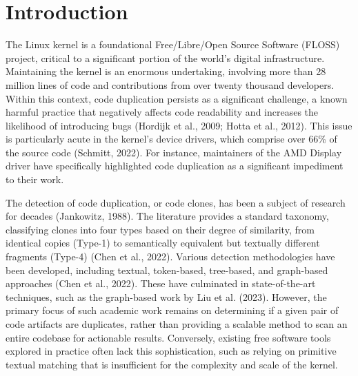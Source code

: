 \documentclass[conference]{IEEEtran}
\begin{document}




%
\IEEEpeerreviewmaketitle



\section{Introduction}

The Linux kernel is a foundational Free/Libre/Open Source Software (FLOSS) project, 
critical to a significant portion of the world's digital infrastructure. Maintaining 
the kernel is an enormous undertaking, involving more than 28 million lines of code 
and contributions from over twenty thousand developers. Within this context, code 
duplication persists as a significant challenge, a known harmful practice that 
negatively affects code readability and increases the likelihood of introducing bugs 
(Hordijk et al., 2009; Hotta et al., 2012). This issue is particularly acute in the 
kernel's device drivers, which comprise over 66\% of the source code (Schmitt, 2022). 
For instance, maintainers of the AMD Display driver have specifically highlighted code 
duplication as a significant impediment to their work.

The detection of code duplication, or code clones, has been a subject of research for 
decades (Jankowitz, 1988). The literature provides a standard taxonomy, classifying 
clones into four types based on their degree of similarity, from identical copies 
(Type-1) to semantically equivalent but textually different fragments (Type-4) (Chen et al., 2022). 
Various detection methodologies have been developed, including textual, token-based, 
tree-based, and graph-based approaches (Chen et al., 2022). These have culminated in 
state-of-the-art techniques, such as the graph-based work by Liu et al. (2023). 
However, the primary focus of such academic work remains on determining if a given 
pair of code artifacts are duplicates, rather than providing a scalable method to scan 
an entire codebase for actionable results. Conversely, existing free software tools explored 
in practice often lack this sophistication, such as relying on primitive textual matching 
that is insufficient for the complexity and scale of the kernel.
\end{document}
